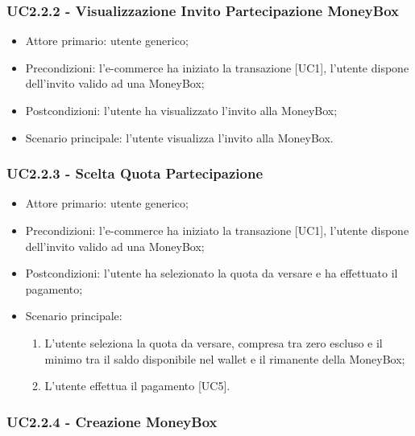 \subsubsection{UC2.2.2 - Visualizzazione Invito Partecipazione MoneyBox}

\begin{itemize}
    \item Attore primario: utente generico;
    \item Precondizioni: l'e-commerce\glo{} ha iniziato la transazione [UC1], l'utente dispone dell'invito valido ad una MoneyBox\glo{};
    \item Postcondizioni: l'utente ha visualizzato l'invito alla MoneyBox\glo{};
    \item Scenario principale: l'utente visualizza l'invito alla MoneyBox\glo{}.
\end{itemize}

\subsubsection{UC2.2.3 - Scelta Quota Partecipazione}

\begin{itemize}
    \item Attore primario: utente generico;
    \item Precondizioni: l'e-commerce\glo{} ha iniziato la transazione [UC1], l'utente dispone dell'invito valido ad una MoneyBox\glo{};
    \item Postcondizioni: l'utente ha selezionato la quota da versare e ha effettuato il pagamento;
    \item Scenario principale:
          \begin{enumerate}
              \item L'utente seleziona la quota da versare, compresa tra zero escluso e il minimo tra il saldo disponibile nel wallet e il rimanente della MoneyBox\glo{};
              \item L'utente effettua il pagamento [UC5].
          \end{enumerate}
\end{itemize}

\subsubsection{UC2.2.4 - Creazione MoneyBox}

